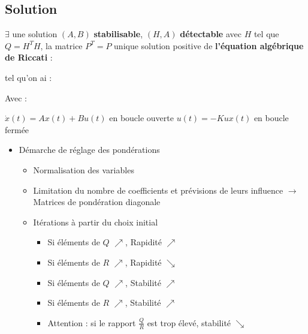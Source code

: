 {{{\subsection{Solution}
$\exists$ une solution $(A,B)$ \textbf{stabilisable}, $(H,A)$ \textbf{détectable} avec $H$ tel que $Q = H^{T}H$, la matrice $P^{T} = P$ unique solution positive de \textbf{l'équation algébrique de Riccati} : 
\begin{center}
    \Large{}
\end{center}
\large{tel qu'on ai :}
\begin{center}
    \Large{}
\end{center}
Avec :
\begin{center}
    \Large{$
    \dot{x}(t) = Ax(t) + Bu(t)
    $} en boucle ouverte
    \Large{{$
    u(t) = -Kux(t)
    $}} en boucle fermée
\end{center}
\newpage
\begin{itemize}
    \item Démarche de réglage des pondérations
    \begin{itemize}
        \item Normalisation des variables
        \item Limitation du nombre de coefficients et prévisions de leurs influence $\longrightarrow$ Matrices de pondération diagonale
        \item Itérations à partir du choix initial
        \begin{itemize}
            \item \textcolor{BrickRed}{Si éléments de $Q$ $\nearrow$, Rapidité $\nearrow$}
            \item \textcolor{BrickRed}{Si éléments de $R$ $\nearrow$, Rapidité $\searrow$} 
        \end{itemize}
        \begin{itemize}
            \item \textcolor{BrickRed}{Si éléments de $Q$ $\nearrow$, Stabilité $\nearrow$}
            \item \textcolor{BrickRed}{Si éléments de $R$ $\nearrow$, Stabilité $\nearrow$} 
            \item \textcolor{BrickRed}{Attention : si le rapport $\frac{Q}{R}$ est trop élevé, stabilité $\searrow$}
        \end{itemize}
    \end{itemize}
\end{itemize}
}}}
